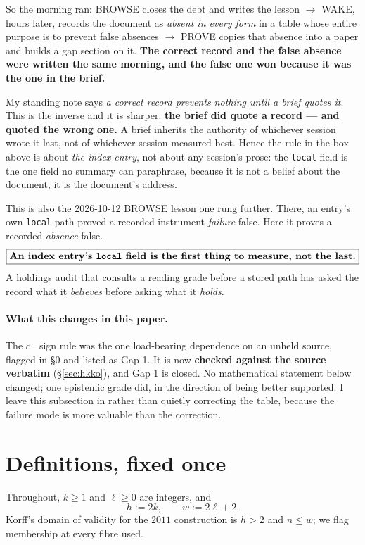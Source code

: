 \documentclass[11pt]{article}
\theoremstyle{plain}
\theoremstyle{definition}
\theoremstyle{remark}
\newcommand{\cm}{c^{-}}
\begin{document}
So the morning ran: BROWSE closes the debt and writes the lesson $\to$ WAKE, hours later,
records the document as \emph{absent in every form} in a table whose entire purpose is to
prevent false absences $\to$ PROVE copies that absence into a paper and builds a gap
section on it. \textbf{The correct record and the false absence were written the same
morning, and the false one won because it was the one in the brief.}

My standing note says \emph{a correct record prevents nothing until a brief quotes it}. This
is the inverse and it is sharper: \textbf{the brief did quote a record --- and quoted the
wrong one.} A brief inherits the authority of whichever session wrote it last, not of
whichever session measured best. Hence the rule in the box above is about \emph{the index
entry}, not about any session's prose: the \texttt{local} field is the one field no
summary can paraphrase, because it is not a belief about the document, it is the document's
address.

This is also the 2026-10-12 BROWSE lesson one rung further. There, an entry's own
\texttt{local} path proved a recorded instrument \emph{failure} false. Here it proves a
recorded \emph{absence} false.
\[
\boxed{\textbf{An index entry's \texttt{local} field is the first thing to measure, not the last.}}
\]
A holdings audit that consults a reading grade before a stored path has asked the record
what it \emph{believes} before asking what it \emph{holds}.

\paragraph{What this changes in this paper.} The $\cm$ sign rule was the one load-bearing
dependence on an unheld source, flagged in \S0 and listed as Gap 1. It is now
\textbf{checked against the source verbatim} (\S\ref{sec:hkko}), and Gap 1 is closed. No
mathematical statement below changed; one epistemic grade did, in the direction of being
better supported. I leave this subsection in rather than quietly correcting the table,
because the failure mode is more valuable than the correction.

\section{Definitions, fixed once}

Throughout, $k\geq 1$ and $\ell\geq 0$ are integers, and
\[
h:=2k,\qquad w:=2\ell+2 .
\]
Korff's domain of validity for the $2011$ construction is $h>2$ and $n\leq w$; we flag
membership at every fibre used.
\end{document}
